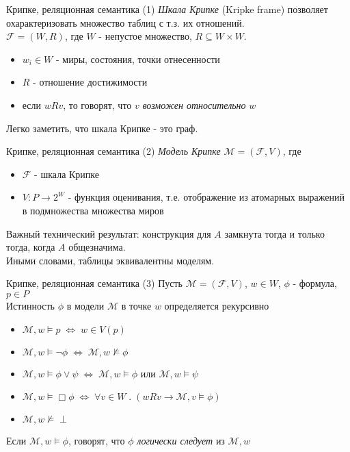 \documentclass{beamer}
\begin{document}
\begin{frame}{Крипке, реляционная семантика (1)}
\textit{Шкала Крипке} (Kripke frame) позволяет охарактеризовать множество таблиц с т.з. их отношений.\\
\bigskip
$\mathcal{F} = (W, R)$, где $W$ - непустое множество, $R \subseteq W \times W$.\\
\bigskip
\begin{itemize}
  \item $w_i \in W$ - миры, состояния, точки отнесенности
  \item $R$ - отношение достижимости
  \item если $wRv$, то говорят, что $v$ \textit{возможен относительно} $w$
\end{itemize}
\bigskip
Легко заметить, что шкала Крипке - это граф.
\end{frame}

\begin{frame}{Крипке, реляционная семантика (2)}
\textit{Модель Крипке} $\mathcal{M} = (\mathcal{F}, V)$, где  
\bigskip
\begin{itemize}
  \item $\mathcal{F}$ - шкала Крипке
  \item $V : P \to 2^W$ - функция оценивания, т.е. отображение из атомарных выражений в подмножества множества миров
\end{itemize}
\bigskip
Важный технический результат: конструкция для $A$ замкнута тогда и только тогда, когда $A$ общезначима.\\
\bigskip
Иными словами, таблицы эквивалентны моделям.
\end{frame}

\begin{frame}{Крипке, реляционная семантика (3)}
Пусть $\mathcal{M} = (\mathcal{F}, V)$, $w \in W$, $\phi$ - формула, $p \in P$\\
\bigskip
Истинность $\phi$ в модели $\mathcal{M}$ в точке $w$ определяется рекурсивно\\
\bigskip
\begin{itemize}
  \item $\mathcal{M}, w \models p \; \Longleftrightarrow \; w \in V(p)$
  \item $\mathcal{M}, w \models \neg \phi \; \Longleftrightarrow \; \mathcal{M}, w \not\models \phi$
  \item $\mathcal{M}, w \models \phi \vee \psi \; \Longleftrightarrow \; \mathcal{M}, w \models \phi$ или $\mathcal{M}, w \models \psi$
  \item $\mathcal{M}, w \models \Box \phi \; \Longleftrightarrow \; \forall v \in W \; . \; (w R v \to \mathcal{M}, v \models \phi)$
  \item $\mathcal{M}, w \not\models \perp$
\end{itemize}
\bigskip
Если $\mathcal{M}, w \models \phi$, говорят, что $\phi$ \textit{логически следует} из $\mathcal{M}, w$
\end{frame}
\end{document}
